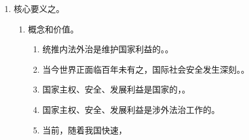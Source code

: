 \begin{enumerate}
\begin{enumerate}
\begin{enumerate}
                  \item 全面贯彻。
                        \begin{enumerate}
                          \item 规定国家，
                          \item 国家公职人员就职前。
                        \end{enumerate}
                  \item 推进工作。
                        \begin{enumerate}
                          \item {}全人大和全人常职责，
                          \item {}全人常程序，
                          \item {}。
                        \end{enumerate}
                  \item 深入开展。
                        \begin{enumerate}
                          \item {}群众，让宪法。
                          \item {}加强，带头宪法。
                        \end{enumerate}
                \end{enumerate}
        \end{enumerate}
  \item 核心要义之。
        \begin{enumerate}
          \item 概念和价值。
                \begin{enumerate}
                  \item 统推内法外治是维护国家利益的。。
                  \item 当今世界正面临百年未有之，国际社会安全发生深刻。。
                  \item 国家主权、安全、发展利益是国家的，。
                  \item {}国家主权、安全、发展利益是涉外法治工作的。
                  \item 当前，随着我国快速，

\end{enumerate}
\end{enumerate}
\end{enumerate}
